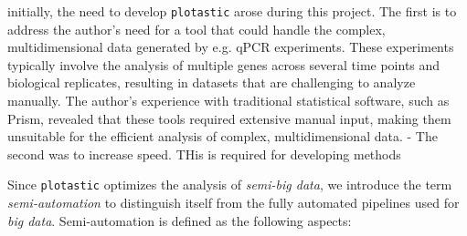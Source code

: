 initially, the need to develop \texttt{plotastic} arose during this project. The
first is to address the author's need for a tool that could handle the complex,
multidimensional data generated by e.g. qPCR experiments. These experiments
typically involve the analysis of multiple genes across several time points and
biological replicates, resulting in datasets that are challenging to analyze
manually. The author's experience with traditional statistical software, such
as Prism, revealed that these tools required extensive manual input, making
them unsuitable for the efficient analysis of complex, multidimensional data. -
The second was to increase speed. THis is required for developing methods


Since \texttt{plotastic} optimizes the analysis of \textit{semi-big data}, we
introduce the term \textit{semi-automation} to distinguish itself from the fully
automated pipelines used for \textit{big data}. Semi-automation is
defined as the following aspects:
